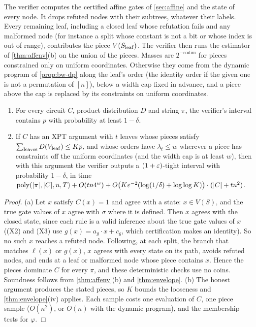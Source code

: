 The verifier computes the certified affine gates of \cref{sec:affine} and the state of
every node. It drops refuted nodes with their subtrees, whatever their labels. Every
remaining leaf, including a closed leaf whose refutation fails and any malformed node
(for instance a split whose constant is not a bit or whose index is out of range),
contributes the piece $V(S_{\rm leaf})$. The verifier then runs the estimator of
\cref{thm:affenv}(b) on the union of the pieces. Masses are $2^{-\mathrm{codim}}$ for
pieces constrained only on uniform coordinates. Otherwise they come from the dynamic
program of \cref{prop:bw-dp} along the leaf's order (the identity order if the given one
is not a permutation of $[n]$), below a width cap fixed in advance, and a piece above
the cap is replaced by its constraints on uniform coordinates.

\begin{theorem}\label{thm:xpt}
\begin{enumerate}[label=(\alph*)]
\item For every circuit $C$, product distribution $D$ and string $\pi$, the verifier's
interval contains $p$ with probability at least $1-\delta$.
\item If $C$ has an XPT argument with $t$ leaves whose pieces satisfy
$\sum_{\rm leaves}D(V_{\rm leaf})\le Kp$, and whose orders have $\lambda_t\le w$
wherever a piece has constraints off the uniform coordinates (and the width cap is at
least $w$), then with this argument
the verifier outputs a $(1+\varepsilon)$-tight interval with probability $1-\delta$, in time
$\mathrm{poly}(|\pi|,|C|,n,T)+O(tn4^w)+O\big(K\varepsilon^{-2}(\log(1/\delta)+\log\log K)\big)\cdot(|C|+tn^2)$.
\end{enumerate}
\end{theorem}

\begin{proof}
(a) Let $x$ satisfy $C(x)=1$ and agree with a state: $x\in V(S)$, and the true gate
values of $x$ agree with $\sigma$ where it is defined. Then $x$ agrees with the closed
state, since each rule is a valid inference about the true gate values of $x$ ((X2) and (X3)
use $g(x)=a_g\cdot x+c_g$, which certification makes an identity). So no such $x$
reaches a refuted node. Following, at each split, the branch that matches $\ell(x)$ or
$g(x)$, $x$ agrees with every state on its path, avoids refuted nodes, and ends at a
leaf or malformed node whose piece contains $x$. Hence the pieces dominate $C$ for
every $\pi$, and these deterministic checks use no coins. Soundness follows from
\cref{thm:affenv}(b) and \cref{thm:envelope}. (b) The honest argument produces the
stated pieces, so $K$ bounds the looseness and \cref{thm:envelope}(iv) applies. Each
sample costs one evaluation of $C$, one piece sample ($O(n^2)$, or $O(n)$ with the
dynamic program), and the membership tests for $\varphi$.
\end{proof}

